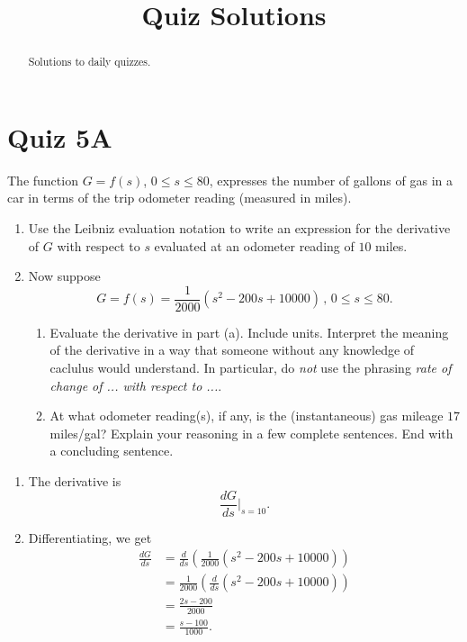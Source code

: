 \documentclass{ximera}
\title{Quiz Solutions}
\begin{document}
\begin{abstract}
Solutions to daily quizzes.
\end{abstract}
\maketitle


\section{Quiz 5A}

\begin{question} \label{QQuiz5A}

The function $G=f(s)$, $0\leq s \leq 80$, expresses the number of gallons of gas in a car in terms of the trip odometer reading (measured in miles). 

\begin{enumerate}
\item Use the Leibniz evaluation notation to write an expression for the derivative of $G$ with respect to $s$ evaluated at an odometer reading of $10$ miles.

\item Now suppose
\[
    G = f(s) = \frac{1}{2000}\left( s^2 - 200s + 10000  \right) \, , \, 0\leq s \leq 80.
\]

\begin{enumerate}
\item Evaluate the derivative in part (a). Include units. Interpret the meaning of the derivative in a way that someone without any knowledge of caclulus would understand. In particular, do \emph{not} use the phrasing \emph{rate of change of ... with respect to ...}.

\item At what odometer reading(s), if any, is the (instantaneous) gas mileage $17$ miles/gal? Explain your reasoning in a few complete sentences. End with a concluding sentence.
\end{enumerate}
\end{enumerate}

\begin{explanation}

\begin{enumerate}
\item The derivative is
\[
      \frac{dG}{ds}\Big|_{s=10} .
\]

\item Differentiating, we get
\begin{align*}
 \frac{dG}{ds}  &= \frac{d}{ds}\left( \frac{1}{2000}\left( s^2 - 200s + 10000  \right) \right) \\
                        &= \frac{1}{2000} \left( \frac{d}{ds}  \left( s^2 - 200s + 10000  \right)  \right) \\
                        &=\frac{2s-200}{2000} \\
                       &=\frac{s-100}{1000} .
\end{align*}


\end{enumerate}
\end{explanation}
\end{question}
\end{document}
